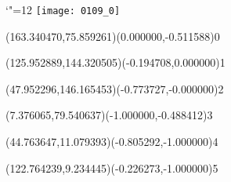 \documentclass[12pt]{article}
\begin{document}
\makeatletter%
\let\ASYencoding\f@encoding%
\let\ASYfamily\f@family%
\let\ASYseries\f@series%
\let\ASYshape\f@shape%
\makeatother%
{\catcode`"=12%
\texttt{[image: 0109\_0]}%
}%
\kern -170.716535pt%
%
%
\fontsize{12.000000}{14.400000}\selectfont%
\usefont{\ASYencoding}{\ASYfamily}{\ASYseries}{\ASYshape}%
\ASYalign(163.340470,75.859261)(0.000000,-0.511588){0}%
%
%
\fontsize{12.000000}{14.400000}\selectfont%
\ASYalign(125.952889,144.320505)(-0.194708,0.000000){1}%
%
%
\fontsize{12.000000}{14.400000}\selectfont%
\ASYalign(47.952296,146.165453)(-0.773727,-0.000000){2}%
%
%
\fontsize{12.000000}{14.400000}\selectfont%
\ASYalign(7.376065,79.540637)(-1.000000,-0.488412){3}%
%
%
\fontsize{12.000000}{14.400000}\selectfont%
\ASYalign(44.763647,11.079393)(-0.805292,-1.000000){4}%
%
%
\fontsize{12.000000}{14.400000}\selectfont%
\ASYalign(122.764239,9.234445)(-0.226273,-1.000000){5}%
\end{document}
